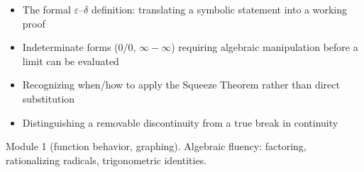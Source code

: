 \documentclass[11pt]{article}
\begin{document}
\begin{diffbox}
\begin{itemize}[nosep]
  \item The formal $\varepsilon$--$\delta$ definition: translating a symbolic statement into a working proof
  \item Indeterminate forms ($0/0$, $\infty - \infty$) requiring algebraic manipulation before a limit can be evaluated
  \item Recognizing when/how to apply the Squeeze Theorem rather than direct substitution
  \item Distinguishing a removable discontinuity from a true break in continuity
\end{itemize}
\end{diffbox}

\begin{prereqbox}
Module 1 (function behavior, graphing). Algebraic fluency: factoring, rationalizing
radicals, trigonometric identities.
\end{prereqbox}

\end{document}
